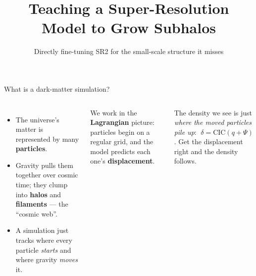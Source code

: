\documentclass[aspectratio=169]{beamer}
\title{Teaching a Super-Resolution Model to Grow Subhalos}
\subtitle{Directly fine-tuning SR2 for the small-scale structure it misses}
\author{}
\date{}
\begin{document}

\begin{frame}
\titlepage
\end{frame}

\begin{frame}{What is a dark-matter simulation?}
\small
\begin{columns}[T]
\begin{itemize}
    \item The universe's matter is represented by many \textbf{particles}.
    \item Gravity pulls them together over cosmic time; they clump into
          \textbf{halos} and \textbf{filaments} --- the ``cosmic web''.
    \item A simulation just tracks where every particle \emph{starts} and
          where gravity \emph{moves} it.
\end{itemize}
\vspace{0.2cm}
{\footnotesize We work in the \textbf{Lagrangian} picture: particles begin on a
regular grid, and the model predicts each one's \textbf{displacement}.}

\centering
{}

{\footnotesize The density we see is just \emph{where the moved particles pile
up}: $\;\delta=\mathrm{CIC}(q+\Psi)$. Get the displacement right and the density
follows.}
\end{columns}
\end{frame}
\end{document}
